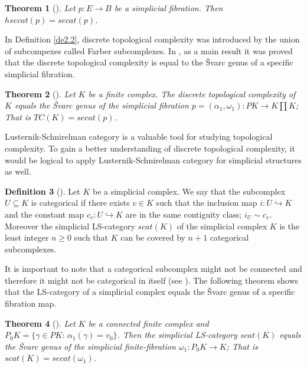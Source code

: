 \documentclass[preprint,11pt %
]{hjm1}
\newtheorem{theorem}{Theorem}[section]
\theoremstyle{definition}
\newtheorem{definition}[theorem]{Definition}
\begin{document}
\begin{theorem}[\cite{sim}]\label{iii}
Let $p:E\to B$ be a simplicial fibration. Then $hsecat(p)=secat(p)$.
\end{theorem}


In Definition \ref{de2.2}, discrete topological complexity was introduced by the union of subcompexes called Farber subcomplexes. In \cite{sim},  as a main result it was proved that the discrete topological complexity is equal to the \v{S}varc genus of a specific simplicial fibration.

\begin{theorem}[\cite{sim}]\label{b}
Let $K$ be a finite complex. The discrete topological complexity of $K$ equals the \v{S}varc genus of the simplicial fibration $p=(\alpha_1 , \omega_1 ):PK\to K\prod  K$; That is $TC(K)=secat(p)$.
\end{theorem}


Lusternik-Schnirelman category is a valuable tool for studying topological complexity. To gain a better understanding of discrete topological complexity, it would be logical to apply Lusternik-Schnirelman category for simplicial structures as well.


\begin{definition}[\cite{Lus}]\label{de2.12n}
Let $K$ be a simplicial complex. We say that the subcomplex $U\subseteq K$ is categorical if there exists $v\in K$ such that the inclusion map $i:U\hookrightarrow K$ and the constant map $c_v:U\hookrightarrow K$ are in the same contiguity class; $i_U\sim c_v$.
Moreover the simplicial LS-category $scat(K)$ of the simplicial complex
 $K$ is the least integer $n \geq 0$ such that $K$ can be covered by $n + 1$ categorical subcomplexes. 
\end{definition}

It is important to note that a categorical subcomplex might not be  connected and therefore it might not be categorical in itself (see \cite{Fer}).
The following theorem shows that the LS-category of a simplicial complex equals the \v{S}varc genus of a specific fibration map.



\begin{theorem}[\cite{sim}]\label{th2.13n}
Let $K$ be a connected finite complex and $P_0 K=\lbrace \gamma \in PK :\, \alpha_1 (\gamma )=v_0 \rbrace $. Then the simplicial LS-category $scat(K)$ equals the \v{S}varc genus of the simplicial finite-fibration $\omega_1:P_0 K\to K$; That is $scat(K)=secat(\omega_1)$.
\end{theorem}
\end{document}
